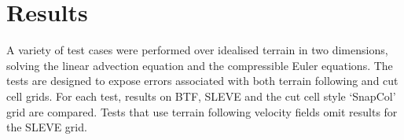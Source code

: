 \chapter{Results}
\label{sec:results}

A variety of test cases were performed over idealised terrain in two dimensions, solving the linear advection equation and the compressible Euler equations.  The tests are designed to expose errors associated with both terrain following and cut cell grids.
For each test, results on BTF, SLEVE and the cut cell style `SnapCol' grid are compared.  Tests that use terrain following velocity fields omit results for the SLEVE grid.






